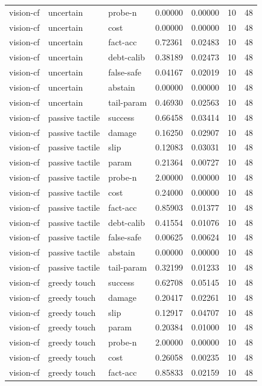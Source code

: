 \documentclass{article}
\begin{document}
\begin{center}
\begin{longtable}{lllllll}
vision-cf & uncertain & probe-n & 0.00000 & 0.00000 & 10 & 48 \\
vision-cf & uncertain & cost & 0.00000 & 0.00000 & 10 & 48 \\
vision-cf & uncertain & fact-acc & 0.72361 & 0.02483 & 10 & 48 \\
vision-cf & uncertain & debt-calib & 0.38189 & 0.02473 & 10 & 48 \\
vision-cf & uncertain & false-safe & 0.04167 & 0.02019 & 10 & 48 \\
vision-cf & uncertain & abstain & 0.00000 & 0.00000 & 10 & 48 \\
vision-cf & uncertain & tail-param & 0.46930 & 0.02563 & 10 & 48 \\
vision-cf & passive tactile & success & 0.66458 & 0.03414 & 10 & 48 \\
vision-cf & passive tactile & damage & 0.16250 & 0.02907 & 10 & 48 \\
vision-cf & passive tactile & slip & 0.12083 & 0.03031 & 10 & 48 \\
vision-cf & passive tactile & param & 0.21364 & 0.00727 & 10 & 48 \\
vision-cf & passive tactile & probe-n & 2.00000 & 0.00000 & 10 & 48 \\
vision-cf & passive tactile & cost & 0.24000 & 0.00000 & 10 & 48 \\
vision-cf & passive tactile & fact-acc & 0.85903 & 0.01377 & 10 & 48 \\
vision-cf & passive tactile & debt-calib & 0.41554 & 0.01076 & 10 & 48 \\
vision-cf & passive tactile & false-safe & 0.00625 & 0.00624 & 10 & 48 \\
vision-cf & passive tactile & abstain & 0.00000 & 0.00000 & 10 & 48 \\
vision-cf & passive tactile & tail-param & 0.32199 & 0.01233 & 10 & 48 \\
vision-cf & greedy touch & success & 0.62708 & 0.05145 & 10 & 48 \\
vision-cf & greedy touch & damage & 0.20417 & 0.02261 & 10 & 48 \\
vision-cf & greedy touch & slip & 0.12917 & 0.04707 & 10 & 48 \\
vision-cf & greedy touch & param & 0.20384 & 0.01000 & 10 & 48 \\
vision-cf & greedy touch & probe-n & 2.00000 & 0.00000 & 10 & 48 \\
vision-cf & greedy touch & cost & 0.26058 & 0.00235 & 10 & 48 \\
vision-cf & greedy touch & fact-acc & 0.85833 & 0.02159 & 10 & 48 \\
\bottomrule
\end{longtable}
\renewcommand{\arraystretch}{1.0}
\end{center}
\end{document}
